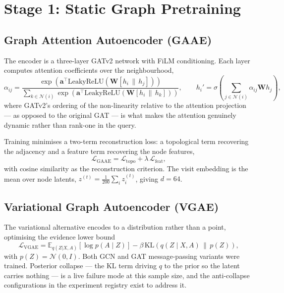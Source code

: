 \section{Stage 1: Static Graph Pretraining}
\label{sec:stage1}

\subsection{Graph Attention Autoencoder (GAAE)}

The encoder is a three-layer GATv2 network with FiLM conditioning. Each layer computes
attention coefficients over the neighbourhood,
\[
  \alpha_{ij} = \frac{\exp\!\left(\mathbf{a}^\top \mathrm{LeakyReLU}\!\left(\mathbf{W}[h_i \,\|\, h_j]\right)\right)}
                     {\sum_{k \in \mathcal{N}(i)} \exp\!\left(\mathbf{a}^\top \mathrm{LeakyReLU}\!\left(\mathbf{W}[h_i \,\|\, h_k]\right)\right)},
  \qquad
  h_i' = \sigma\!\left(\sum_{j \in \mathcal{N}(i)} \alpha_{ij} \mathbf{W} h_j\right),
\]
where GATv2's ordering of the non-linearity relative to the attention projection --- as
opposed to the original GAT --- is what makes the attention genuinely dynamic rather than
rank-one in the query.

Training minimises a two-term reconstruction loss: a topological term recovering the
adjacency and a feature term recovering the node features,
\[
  \mathcal{L}_{\mathrm{GAAE}} = \mathcal{L}_{\mathrm{topo}} + \lambda\,\mathcal{L}_{\mathrm{feat}},
\]
with cosine similarity as the reconstruction criterion. The visit embedding is the mean over
node latents, $z^{(t)} = \frac{1}{200}\sum_i z_i^{(t)}$, giving $d = 64$.

\subsection{Variational Graph Autoencoder (VGAE)}

The variational alternative encodes to a distribution rather than a point, optimising the
evidence lower bound
\[
  \mathcal{L}_{\mathrm{VGAE}} = \mathbb{E}_{q(Z|X,A)}\!\left[\log p(A \mid Z)\right]
    - \beta \, \mathrm{KL}\!\left(q(Z \mid X, A) \,\|\, p(Z)\right),
\]
with $p(Z) = \mathcal{N}(0, I)$. Both GCN and GAT message-passing variants were trained.
Posterior collapse --- the KL term driving $q$ to the prior so the latent carries nothing ---
is a live failure mode at this sample size, and the anti-collapse configurations in the
experiment registry exist to address it.

